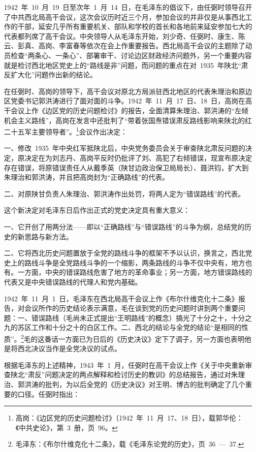 1942~年~10~月~19~日至次年~1~月~14~日，在毛泽东的倡议下，由任弼时领导召开了中共西北局高干会议，这次会议历时近三个月，参加会议的并非仅是从事西北工作的干部，延安几乎所有重要机关、部队和学校的首长和各地前来延安参加七大的代表都列席了高干会议。中央领导人从毛泽东开始，刘少奇、任弼时、康生、陈云、彭真、高岗、李富春等依次在会上作重要报告。西北局高干会议的主题除了动员检查“两条心、一条心”、部署审干、讨论边区财政经济问题外，另一个重要内容就是检讨西北地区党史上的“路线是非”问题，而问题的重点在对~1935~年陕北“肃反扩大化”问题作出新的结论。

在任弼时、高岗的领导下，高干会议对原北方局派驻西北地区的代表朱理治和原边区党委书记郭洪涛进行了面对面的斗争。1942~年~11~月~17~日、18~日，高岗在高干会议上作《边区党的历史问题检讨》的报告，全面清算朱理治、郭洪涛的“左倾机会主义路线”，高岗在发言中还批判了“带着张国焘错误肃反路线影响来陕北的红二十五军主要领导者”。\footnote{高岗：《边区党的历史问题检讨》（1942~年~11~月~17、18~日），载郭华伦：《中共史论》，第~3~册，页~96。}会议作出决定：

一、修改~1935~年中央红军抵陕北后，中央党务委员会关于审查陕北肃反问题的决定，原决定在为刘志丹、高岗平反时仍批评了刘、高犯了右倾错误，现宣布原决定存在错误，将原错误责任人从戴季英（陕甘边政治保卫局局长）、聂洪钧，扩大到朱理治和郭洪涛，并且把高岗封为“正确路线”的代表。

二、对原陕甘负责人朱理治、郭洪涛作出处罚，将两人定为“错误路线”的代表。

这个新决定对毛泽东日后作出正式的党史决定具有重大意义：

一、它开创了用两分法——即以“正确路线”与“错误路线”的斗争为纲，总结党的历史的新思路与新方法。

二、它将西北历史问题置放于全党的路线斗争的框架不予以认识，换言之，西北党史上的路线斗争是全党路线斗争的一个缩影，两条路线的斗争不仅中央有，地方也有。一方面，中央的错误路线危害了地方的革命事业；另一方面，地方错误路线的代表又是中央错误路线的代理人和党内基础。

1942~年~11~月~1~日，毛泽东在西北局高干会议上作《布尔什维克化十二条》报告，对会议所作的历史结论表示满意，毛在谈到党的历史问题时讲到两个重要问题：一、错误路线（毛尚未正式提出“王明路线”的概念）搞光了十分之十，十分之九的苏区工作和十分之十的白区工作。二、西北的结论与全党的结论“是相同的性质”。\footnote{毛泽东：《布尔什维克化十二条》，载《毛泽东论党的历史》，页~36~—~37.}毛的这番话一方面已为日后的《历史决议》定下了调子，另一方面也表明他是将西北决议当作是全党决议的试点。

根据毛泽东的上述精神，1943~年~1~月，任弼时在高干会议上作《关于中央重新审查陕北“肃反”问题决定的两点解释和检讨历史的教训》的总结报告，通过对朱理治、郭洪涛的批判，为以后全党的《历史决议》对王明、博古的批判确定了几个重要的口径。任弼时指出：

